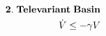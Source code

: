 \documentclass[preview]{standalone}
\begin{document}
\begin{align*}
\special{dvisvgm:raw <g id='unique000'>}\mathbf{2.\;Televariant\;Basin}\\\dot{V}\le -\gamma V\special{dvisvgm:raw </g>}
\end{align*}
\end{document}
